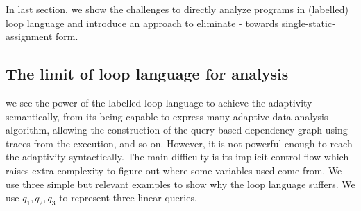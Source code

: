 In last section, we show the challenges to directly analyze programs in (labelled) loop language and introduce an approach to eliminate - towards single-static-assignment form.

\subsection{The limit of loop language for analysis}
we see the power of the labelled loop language to achieve the adaptivity semantically, from its being capable to express many adaptive data analysis algorithm,  allowing the construction of the query-based dependency graph using traces from the execution, and so on.
However, it is not powerful enough to reach the adaptivity syntactically. The main difficulty is its implicit control flow which raises extra complexity to figure out where some variables used come from. We use three simple but relevant examples to show why the loop language suffers. We use $q_1,q_2,q_3$ to represent three linear queries.

